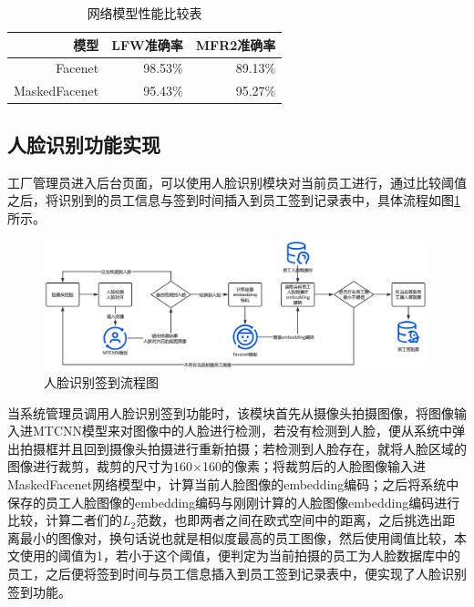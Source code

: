 \begin{table}[H]
    \centering
    \caption{网络模型性能比较表}
    \label{tab:mdcprs}
    \begin{tabular}{rrr}
        \toprule
        模型 & LFW准确率 & MFR2准确率 \\
        \midrule
        Facenet & 98.53\% & 89.13\% \\
        MaskedFacenet & 95.43\% & 95.27\% \\
        \bottomrule
    \end{tabular}
\end{table}

\subsection{人脸识别功能实现}

工厂管理员进入后台页面，可以使用人脸识别模块对当前员工进行，通过比较阈值之后，将识别到的员工信息与签到时间插入到员工签到记录表中，具体流程如图\ref{fig:fcprcs}所示。

\begin{figure}[H]
    \centering
    \includegraphics[width=\textwidth]{figures/5fcprcs.png}
    \caption{人脸识别签到流程图}
    \label{fig:fcprcs}
\end{figure}

当系统管理员调用人脸识别签到功能时，该模块首先从摄像头拍摄图像，将图像输入进MTCNN模型来对图像中的人脸进行检测，若没有检测到人脸，便从系统中弹出拍摄框并且回到摄像头拍摄进行重新拍摄；若检测到人脸存在，就将人脸区域的图像进行裁剪，裁剪的尺寸为160$\times$160的像素；将裁剪后的人脸图像输入进MaskedFacenet网络模型中，计算当前人脸图像的embedding编码；之后将系统中保存的员工人脸图像的embedding编码与刚刚计算的人脸图像embedding编码进行比较，计算二者们的$L_2$范数，也即两者之间在欧式空间中的距离，之后挑选出距离最小的图像对，换句话说也就是相似度最高的员工图像，然后使用阈值比较，本文使用的阈值为1，若小于这个阈值，便判定为当前拍摄的员工为人脸数据库中的员工，之后便将签到时间与员工信息插入到员工签到记录表中，便实现了人脸识别签到功能。